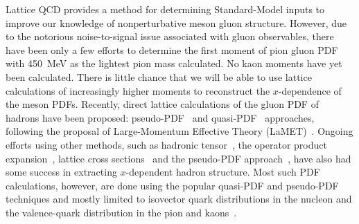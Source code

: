 Lattice QCD provides a method for determining Standard-Model inputs to improve our knowledge of nonperturbative meson gluon structure.
However, due to the notorious noise-to-signal issue associated with gluon observables, there have been only a few efforts to determine the first moment of pion gluon PDF~\cite{Meyer:2007tm,Shanahan:2018pib} with 450~MeV as the lightest pion mass calculated.
No kaon moments have yet been calculated.
There is little chance that we will be able to use lattice calculations of increasingly higher moments to reconstruct the $x$-dependence of the meson PDFs.
Recently, direct lattice calculations of the gluon PDF of hadrons have been proposed: pseudo-PDF~\cite{Balitsky:2019krf} and quasi-PDF~\cite{Zhang:2018diq,Wang:2019tgg} approaches, following the proposal of Large-Momentum Effective Theory (LaMET)~\cite{Ji:2013dva,Ji:2014gla,Ji:2017rah}.
Ongoing efforts using other methods, such as hadronic tensor~\cite{Liu:1993cv}, the operator product expansion~\cite{Detmold:2005gg}, lattice cross sections~\cite{Ma:2014jla,Ma:2017pxb} and the pseudo-PDF approach~\cite{Radyushkin:2017cyf,Orginos:2017kos}, have also had some success in extracting $x$-dependent hadron structure.
Most such PDF calculations, however, are done using the popular quasi-PDF and pseudo-PDF techniques and mostly limited to isovector quark distributions in the nucleon and the valence-quark distribution in the pion and kaons~\cite{Lin:2013yra,Lin:2014zya,Chen:2016utp,Lin:2017ani,Alexandrou:2015rja,Alexandrou:2016jqi,Alexandrou:2017huk,Chen:2017mzz,Alexandrou:2018pbm,Chen:2018xof,Chen:2018fwa,Alexandrou:2018eet,Lin:2018qky,Fan:2018dxu,Liu:2018hxv,Wang:2019tgg,Lin:2019ocg,Chen:2019lcm,Lin:2020reh,Chai:2020nxw,Bhattacharya:2020cen,Lin:2020ssv,Zhang:2020dkn,Li:2020xml,Fan:2020nzz,Gao:2020ito,Lin:2020fsj,Lin:2021brq,Zhang:2020rsx,Alexandrou:2020qtt,Alexandrou:2020zbe,Lin:2020rxa,Gao:2021hxl,Lin:2020rut,Orginos:2017kos,Karpie:2017bzm,Karpie:2018zaz,Karpie:2019eiq,Joo:2019jct,Joo:2019bzr,Radyushkin:2018cvn,Zhang:2018ggy,Izubuchi:2018srq,Joo:2020spy,Bhat:2020ktg,Fan:2020cpa,Sufian:2020wcv,Karthik:2021qwz,Chen:2018fwa,Sufian:2019bol,Izubuchi:2019lyk,Joo:2019bzr,Sufian:2020vzb,Shugert:2020tgq,Gao:2020ito}.

